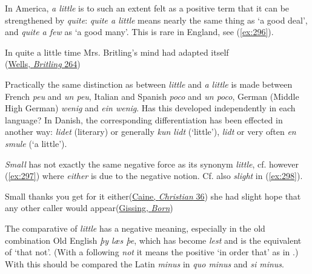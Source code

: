 In America, \textit{a little} is to such an extent felt as a positive term that it can be strengthened by \textit{quite}: \textit{quite a little} means nearly the same thing as `a good deal', and \textit{quite a few} as `a good many'. This is rare in England, see (\ref{ex:296}). 

\ea In quite a little time Mrs. Britling's mind had adapted itself\\\hfill(\href{https://archive.org/details/mrbritlingseesi02unkngoog/page/n282/mode/2up?q=\%22Mrs.+Britling%E2%80%99s+mind+had+adapted\%22&view=theater}{Wells, \textit{Britling} 264})\label{ex:296}
\z


Practically the same distinction as between \textit{little} and \textit{a little} is made between French \textit{peu} and \textit{un peu}, Italian and Spanish \textit{poco} and \textit{un poco}, German (Middle High German) \textit{wenig} and \textit{ein wenig}. Has this developed independently in each language? In Danish, the corresponding differentiation has been effected in another way: \textit{lidet} (literary) or generally \textit{kun lidt} (`little'), \textit{lidt} or very often \textit{en smule} (`a little'). 

\textit{Small} has not exactly the same negative force as its synonym \textit{little}, cf. however (\ref{ex:297}) where \textit{either} is due to the negative notion. Cf. also \textit{slight} in (\ref{ex:298}).

\ea Small thanks you get for it either\hfill(\href{https://archive.org/details/christianstory00cainrich/page/42/mode/2up?q=\%22small+thanks+you\%22&view=theater}{Caine, \textit{Christian} 36}) \label{ex:297}
\ex she had slight hope that any other caller would appear\hfill(\href{https://www.gutenberg.org/cache/epub/4526/pg4526-images.html}{Gissing, \textit{Born}})\label{ex:298} %
\z

The comparative of \textit{little} has a negative meaning, especially in the old combination Old English %
\textit{þy læs þe}, which has become \textit{lest} and is the equivalent of `that not'. (With a following \textit{not} it means the positive `in order that' as in .) With this should be compared the Latin \textit{minus} in \textit{quo minus} and \textit{si minus}.

